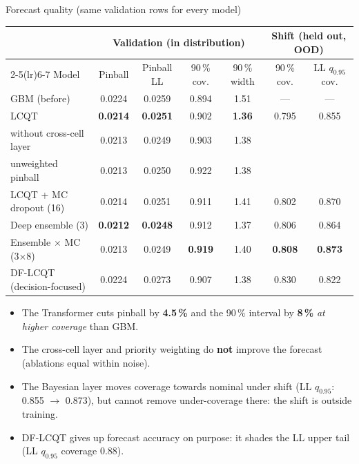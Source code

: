 \documentclass[aspectratio=169,11pt,xcolor=table]{beamer}
\newcommand{\best}[1]{\textbf{\textcolor{good}{#1}}}
\begin{document}
\begin{frame}{Forecast quality (same validation rows for every model)}
  \scriptsize
  \centering
  \begin{tabular}{lcccccc}
    \toprule
    & \multicolumn{4}{c}{Validation (in distribution)} & \multicolumn{2}{c}{Shift (held out, OOD)} \\
    \cmidrule(lr){2-5}\cmidrule(lr){6-7}
    Model & Pinball & Pinball LL & 90\,\% cov. & 90\,\% width & 90\,\% cov. & LL $q_{0.95}$ cov. \\
    \midrule
    GBM (before) & 0.0224 & 0.0259 & 0.894 & 1.51 & --- & --- \\
    LCQT & \best{0.0214} & \best{0.0251} & 0.902 & \best{1.36} & 0.795 & 0.855 \\
    \quad without cross-cell layer & 0.0213 & 0.0249 & 0.903 & 1.38 & & \\
    \quad unweighted pinball & 0.0213 & 0.0250 & 0.922 & 1.38 & & \\
    LCQT + MC dropout (16) & 0.0214 & 0.0251 & 0.911 & 1.41 & 0.802 & 0.870 \\
    Deep ensemble (3) & \best{0.0212} & \best{0.0248} & 0.912 & 1.37 & 0.806 & 0.864 \\
    \rowcolor{good!10} Ensemble $\times$ MC (3$\times$8) & 0.0213 & 0.0249 & \best{0.919} & 1.40 & \best{0.808} & \best{0.873} \\
    DF-LCQT (decision-focused) & 0.0224 & 0.0273 & 0.907 & 1.38 & 0.830 & 0.822 \\
    \bottomrule
  \end{tabular}
  \normalsize
  \begin{itemize}\footnotesize
    \item The Transformer cuts pinball by \textbf{4.5\,\%} and the 90\,\% interval by \textbf{8\,\%} \emph{at higher coverage} than GBM.
    \item The cross-cell layer and priority weighting do \textbf{not} improve the forecast (ablations equal within noise).
    \item The Bayesian layer moves coverage towards nominal under shift (LL $q_{0.95}$: 0.855 $\to$ 0.873), but cannot remove under-coverage there: the shift is outside training.
    \item DF-LCQT gives up forecast accuracy on purpose: it shades the LL upper tail (LL $q_{0.95}$ coverage 0.88).
  \end{itemize}
  \vspace{-2pt}{\tiny Transformer rows read through the mixture layer (1 sample for LCQT); the direct read-out of LCQT gives 0.909 / 1.38. Ablation rows: direct read-out.}
\end{frame}
\end{document}
